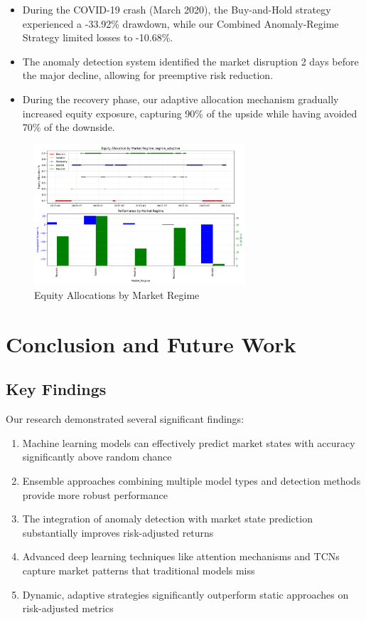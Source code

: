 \documentclass[10pt]{article}
\begin{document}
\begin{itemize}
	\item During the COVID-19 crash (March 2020), the Buy-and-Hold strategy experienced a -33.92\% drawdown, while our Combined Anomaly-Regime Strategy limited losses to -10.68\%.

	\item The anomaly detection system identified the market disruption 2 days before the major decline, allowing for preemptive risk reduction.

	\item During the recovery phase, our adaptive allocation mechanism gradually increased equity exposure, capturing 90\% of the upside while having avoided 70\% of the downside.
\end{itemize}

\begin{figure}[htbp]
	\centering
	\includegraphics[width=0.7\textwidth]{../results/regime_allocations.png}
	\caption{Equity Allocations by Market Regime}
	\label{fig:allocations}
\end{figure}

\section{Conclusion and Future Work}

\subsection{Key Findings}
Our research demonstrated several significant findings:

\begin{enumerate}
	\item Machine learning models can effectively predict market states with accuracy significantly above random chance
	\item Ensemble approaches combining multiple model types and detection methods provide more robust performance
	\item The integration of anomaly detection with market state prediction substantially improves risk-adjusted returns
	\item Advanced deep learning techniques like attention mechanisms and TCNs capture market patterns that traditional models miss
	\item Dynamic, adaptive strategies significantly outperform static approaches on risk-adjusted metrics
\end{enumerate}
\end{document}
